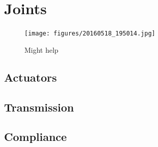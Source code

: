 \section{Joints} %
\label{sec:joints}

\begin{figure}[ht!]
  \centering
  \texttt{[image: figures/20160518\_195014.jpg]}
  \caption{Might help}
  \label{fig:figure1}
\end{figure}

  \subsection{Actuators} %
  \label{sub:actuators}



  \subsection{Transmission} %
  \label{sub:transmission}



  \subsection{Compliance} %
  \label{sub:compliance}



